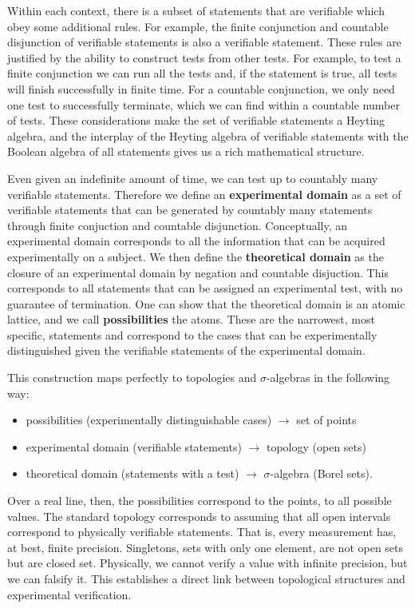 \documentclass[10pt,twocolumn, nofootinbib]{revtex4-2}
\begin{document}
Within each context, there is a subset of statements that are verifiable which obey some additional rules. For example, the finite conjunction and countable disjunction of verifiable statements is also a verifiable statement. These rules are justified by the ability to construct tests from other tests. For example, to test a finite conjunction we can run all the tests and, if the statement is true, all tests will finish successfully in finite time. For a countable conjunction, we only need one test to successfully terminate, which we can find within a countable number of tests. These considerations make the set of verifiable statements a Heyting algebra, and the interplay of the Heyting algebra of verifiable statements with the Boolean algebra of all statements gives us a rich mathematical structure.

Even given an indefinite amount of time, we can test up to countably many verifiable statements. Therefore we define an \textbf{experimental domain} as a set of verifiable statements that can be generated by countably many statements through finite conjuction and countable disjunction. Conceptually, an experimental domain corresponds to all the information that can be acquired experimentally on a subject. We then define the \textbf{theoretical domain} as the closure of an experimental domain by negation and countable disjuction. This corresponds to all statements that can be assigned an experimental test, with no guarantee of termination. One can show that the theoretical domain is an atomic lattice, and we call \textbf{possibilities} the atoms. These are the narrowest, most specific, statements and correspond to the cases that can be experimentally distinguished given the verifiable statements of the experimental domain.

This construction maps perfectly to topologies and $\sigma$-algebras in the following way:
\begin{itemize}
	\item possibilities (experimentally distinguishable cases) $\to$ set of points
	\item experimental domain (verifiable statements) $\to$ topology (open sets)
	\item theoretical domain (statements with a test) $\to$ $\sigma$-algebra (Borel sets).
\end{itemize}

Over a real line, then, the possibilities correspond to the points, to all possible values. The standard topology corresponds to assuming that all open intervals correspond to physically verifiable statements. That is, every measurement has, at best, finite precision. Singletons, sets with only one element, are not open sets but are closed set. Physically, we cannot verify a value with infinite precision, but we can falsify it. This establishes a direct link between topological structures and experimental verification.
\end{document}
